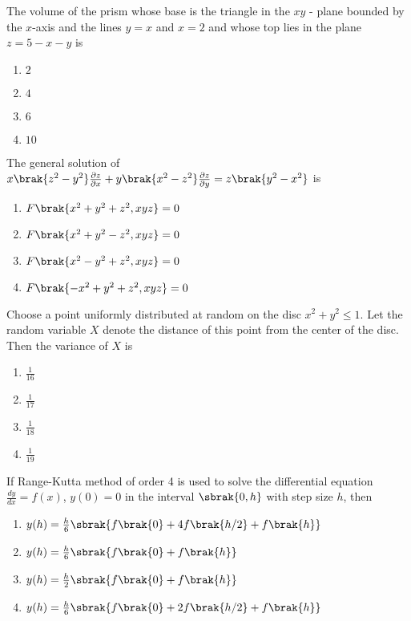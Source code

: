 \iffalse
\chapter{2007}
\author{EE24BTECH11037}
\section{xe}
\fi

    \item The volume of the prism whose base is the triangle in the $xy$ - plane bounded by the $x$-axis and the lines $y=x$ and $x=2$ and whose top lies in the plane $z=5-x-y$ is
    \begin{enumerate}
    \item $2$
    \item $4$
    \item $6$
    \item $10$
    \end{enumerate}
    \item The general solution of $x\brak{z^2-y^2}\frac{\partial z}{\partial x}+y\brak{x^2-z^2}\frac{\partial z}{\partial y}=z\brak{y^2-x^2}$ is
    \begin{enumerate}
        \item $F\brak{x^2+y^2+z^2,xyz}=0$
        \item $F\brak{x^2+y^2-z^2,xyz}=0$
        \item $F\brak{x^2-y^2+z^2,xyz}=0$
        \item $F\brak{-x^2+y^2+z^2,xyz}=0$
    \end{enumerate}
    \item Choose a point uniformly distributed at random on the disc $x^2+y^2 \leq 1$. Let the random variable $X$ denote the distance of this point from the center of the disc. Then the variance of $X$ is 
    \begin{enumerate}
        \item $\frac{1}{16}$
        \item $\frac{1}{17}$
        \item $\frac{1}{18}$
        \item $\frac{1}{19}$
    \end{enumerate}
    \item If Range-Kutta method of order 4 is used to solve the differential equation $\frac{dy}{dx}=f(x)$, $y(0)=0$ in the interval $\sbrak{0,h}$ with step size $h$, then 
    \begin{enumerate}
    \item $y(h)=\frac{h}{6}\sbrak{f\brak{0}+4f\brak{h/2}+f\brak{h}}$
    \item $y(h)=\frac{h}{6}\sbrak{f\brak{0}+f\brak{h}}$
    \item $y(h)=\frac{h}{2}\sbrak{f\brak{0}+f\brak{h}}$
    \item $y(h)=\frac{h}{6}\sbrak{f\brak{0}+2f\brak{h/2}+f\brak{h}}$
    \end{enumerate}
